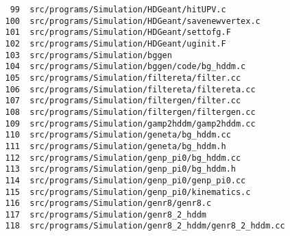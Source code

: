 \small
\begin{verbatim}
    99  src/programs/Simulation/HDGeant/hitUPV.c
   100  src/programs/Simulation/HDGeant/savenewvertex.c
   101  src/programs/Simulation/HDGeant/settofg.F
   102  src/programs/Simulation/HDGeant/uginit.F
   103  src/programs/Simulation/bggen
   104  src/programs/Simulation/bggen/code/bg_hddm.c
   105  src/programs/Simulation/filtereta/filter.cc
   106  src/programs/Simulation/filtereta/filtereta.cc
   107  src/programs/Simulation/filtergen/filter.cc
   108  src/programs/Simulation/filtergen/filtergen.cc
   109  src/programs/Simulation/gamp2hddm/gamp2hddm.cc
   110  src/programs/Simulation/geneta/bg_hddm.cc
   111  src/programs/Simulation/geneta/bg_hddm.h
   112  src/programs/Simulation/genp_pi0/bg_hddm.cc
   113  src/programs/Simulation/genp_pi0/bg_hddm.h
   114  src/programs/Simulation/genp_pi0/genp_pi0.cc
   115  src/programs/Simulation/genp_pi0/kinematics.c
   116  src/programs/Simulation/genr8/genr8.c
   117  src/programs/Simulation/genr8_2_hddm
   118  src/programs/Simulation/genr8_2_hddm/genr8_2_hddm.cc
\end{verbatim}
